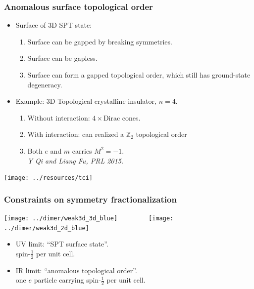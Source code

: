 \documentclass[xcolor=table, 10pt, aspectratio=169]{beamer}
\begin{document}
\begin{frame}
  \frametitle{Anomalous surface topological order}
  \begin{itemize}
    \item Surface of 3D SPT state:
    \begin{enumerate}
      \item Surface can be gapped by breaking symmetries.
      \item Surface can be gapless.
      \item Surface can form a gapped topological order, which still has ground-state degeneracy.
    \end{enumerate}
    \item Example: 3D Topological crystalline insulator, $n=4$.
    \begin{enumerate}
      \item Without interaction: $4\times$Dirac cones.
      \item With interaction: can realized a $\mathbb Z_2$ topological order
      \item Both $e$ and $m$ carries $M^2=-1$.
      \\\emph{\small Y Qi and Liang Fu, PRL 2015.}
    \end{enumerate}
  \end{itemize}
  \begin{center}
    \texttt{[image: ../resources/tci]}
  \end{center}
\end{frame}

\begin{frame}
  \frametitle{Constraints on symmetry fractionalization}
  \centering \texttt{[image: ../dimer/weak3d\_3d\_blue]}~~~~~~~~~\texttt{[image: ../dimer/weak3d\_2d\_blue]}
  \begin{itemize}
    \item UV limit: ``SPT surface state''.\\
    spin-$\frac12$ per unit cell.
    \item IR limit: ``anomalous topological order''.\\
    one $e$ particle carrying spin-$\frac12$ per unit cell.
  \end{itemize}
\end{frame}
\end{document}
